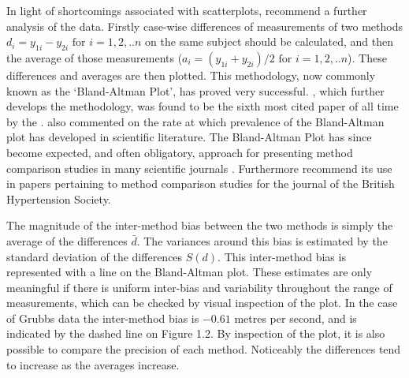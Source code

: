 \documentclass[Main.tex]{subfiles}
\begin{document}
	In light of shortcomings associated with scatterplots,
	\citet*{BA83} recommend a further analysis of the data. Firstly
	case-wise differences of measurements of two methods $d_{i} =
	y_{1i}-y_{2i} \mbox{ for }i=1,2,..n$ on the same subject should be
	calculated, and then the average of those measurements ($a_{i} =
	(y_{1i} + y_{2i})/2 \mbox{ for }i=1,2,..n$). These differences and
	averages are then plotted. This methodology, now commonly known as
	the `Bland-Altman Plot', has proved very successful.
	\citet*{BA86}, which further develops the methodology, was found
	to be the sixth most cited paper of all time by the
	\citet{BAcite}. \cite{Dewitte} also commented on the rate at which
	prevalence of the Bland-Altman plot has developed in scientific
	literature. The Bland-Altman Plot has since become expected, and
	often obligatory, approach for presenting method comparison
	studies in many scientific journals \citep{hollis}. Furthermore
	\citet{BritHypSoc} recommend its use in papers pertaining to
	method comparison studies for the journal of the British
	Hypertension Society.
	
	The magnitude of the inter-method bias between the two methods is
	simply the average of the differences $\bar{d}$. The variances
	around this bias is estimated by the standard deviation of the
	differences $S(d)$. This inter-method bias is represented with a
	line on the Bland-Altman plot. These estimates are only meaningful
	if there is uniform inter-bias and variability throughout the
	range of measurements, which can be checked by visual inspection
	of the plot. In the case of Grubbs data the inter-method bias is
	$-0.61$ metres per second, and is indicated by the dashed line on
	Figure 1.2. By inspection of the plot, it is also possible to
	compare the precision of each method. Noticeably the differences
	tend to increase as the averages increase.
	
\end{document}
